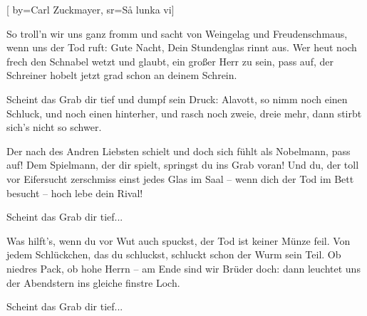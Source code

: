 
[
	by={Carl Zuckmayer},
	sr={Så lunka vi}]
  
\beginverse*                                        
So troll'n wir uns ganz fromm und sacht
von Weingelag und Freudenschmaus,
wenn uns der Tod ruft: Gute Nacht,
Dein Stundenglas rinnt aus.
Wer heut noch frech den Schnabel wetzt
und glaubt, ein großer Herr zu sein,
pass auf, der Schreiner hobelt jetzt
grad schon an deinem Schrein.
\endverse

\beginchorus
Scheint das Grab dir tief und dumpf sein Druck:
Alavott, so nimm noch einen Schluck,
und noch einen hinterher,
und rasch noch zweie, dreie mehr,
dann stirbt sich’s nicht so schwer.
\endchorus

\beginverse*
Der nach des Andren Liebsten schielt
und doch sich fühlt als Nobelmann,
pass auf! Dem Spielmann, der dir spielt,
springst du ins Grab voran!
Und du, der toll vor Eifersucht
zerschmiss einst jedes Glas im Saal –
wenn dich der Tod im Bett besucht –
hoch lebe dein Rival!
\endverse

\beginchorus
Scheint das Grab dir tief...
\endchorus

\beginverse*
Was hilft's, wenn du vor Wut auch spuckst,
der Tod ist keiner Münze feil.
Von jedem Schlückchen, das du schluckst,
schluckt schon der Wurm sein Teil.
Ob niedres Pack, ob hohe Herrn –
am Ende sind wir Brüder doch:
dann leuchtet uns der Abendstern
ins gleiche finstre Loch.
\endverse

\beginchorus
Scheint das Grab dir tief...
\endchorus
\endsong